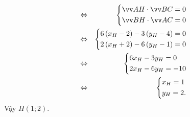 \begin{bt}
{\begin{enumerate}
\begin{itemize}
\begin{eqnarray*}
						& \Leftrightarrow & \heva{&\overrightarrow {AH} \cdot \overrightarrow {BC} = 0\\ &\overrightarrow {BH} \cdot \overrightarrow {AC} = 0}\\
						& \Leftrightarrow & \heva{&6\left(x_H - 2 \right) - 3\left(y_H - 4 \right) = 0\\&2\left(x_H + 2 \right) - 6\left(y_H - 1 \right) = 0} \\
						& \Leftrightarrow & \heva{&6x_H - 3y_H = 0\\ &2x_H - 6y_H = - 10} \\
						& \Leftrightarrow & \heva{&x_H = 1\\&y_H = 2.}
					\end{eqnarray*}
					Vậy $H\left( 1; 2 \right)$.
				\end{itemize}
			\end{enumerate}
		}
	\end{bt}